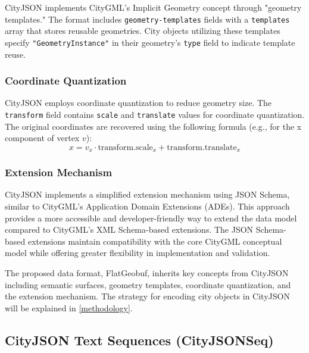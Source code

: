 CityJSON implements CityGML's Implicit Geometry concept through "geometry templates." The format includes \texttt{geometry-templates} fields with a \texttt{templates} array that stores reusable geometries. City objects utilizing these templates specify \texttt{"GeometryInstance"} in their geometry's \texttt{type} field to indicate template reuse.

\subsubsection{Coordinate Quantization}
\label{rw:cityjson:coordinate_quantisation}

CityJSON employs coordinate quantization to reduce geometry size. The \texttt{transform} field contains \texttt{scale} and \texttt{translate} values for coordinate quantization. The original coordinates are recovered using the following formula (e.g., for the x component of vertex $v$):
\begin{equation}
  \label{eq:cityjson:coordinate_quantisation}
  x = v_x \cdot \text{transform.scale}_x + \text{transform.translate}_x
\end{equation}

\subsubsection{Extension Mechanism}
\label{rw:cityjson:extension_mechanism}

CityJSON implements a simplified extension mechanism using JSON Schema, similar to CityGML's Application Domain Extensions (ADEs). This approach provides a more accessible and developer-friendly way to extend the data model compared to CityGML's XML Schema-based extensions. The JSON Schema-based extensions maintain compatibility with the core CityGML conceptual model while offering greater flexibility in implementation and validation.

The proposed data format, FlatGeobuf, inherits key concepts from CityJSON including semantic surfaces, geometry templates, coordinate quantization, and the extension mechanism. The strategy for encoding city objects in CityJSON will be explained in \autoref{methodology}.

\subsection{CityJSON Text Sequences (CityJSONSeq)}
\label{rw:cityjson_enhancements:cityjsonseq}

